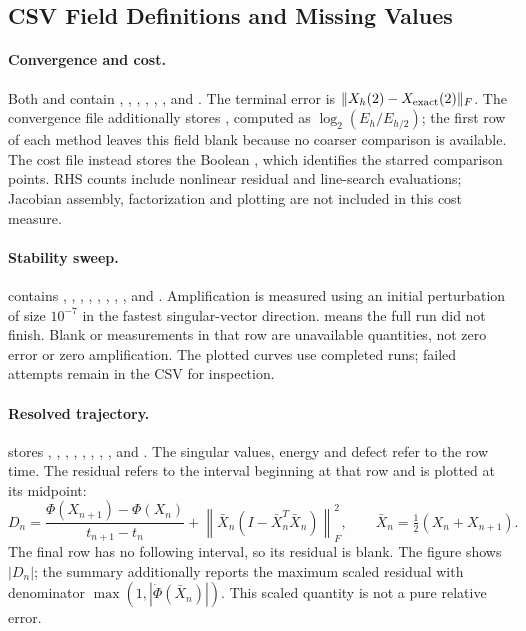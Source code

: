\subsection{CSV Field Definitions and Missing Values}
\begingroup\raggedright
\paragraph{Convergence and cost.}
Both  and  contain
, , ,
, ,
, and .
The terminal error is $\|X_h(2)-X_{\rm exact}(2)\|_F$.
The convergence file additionally stores ,
computed as $\log_2(E_h/E_{h/2})$; the first row of each method leaves
this field blank because no coarser comparison is available.
The cost file instead stores the Boolean ,
which identifies the starred comparison points. RHS counts include
nonlinear residual and line-search evaluations; Jacobian assembly,
factorization and plotting are not included in this cost measure.

\paragraph{Stability sweep.}
 contains , ,
, ,
, ,
, , and
. Amplification is measured using an initial perturbation
of size $10^{-7}$ in the fastest singular-vector direction.
 means the full run did not finish.
Blank or  measurements in that row are unavailable quantities,
not zero error or zero amplification. The plotted curves use completed
runs; failed attempts remain in the CSV for inspection.

\paragraph{Resolved trajectory.}
 stores , , , ,
, , ,
, and
.
The singular values, energy and defect refer to the row time.
The residual refers to the interval beginning at that row and is
plotted at its midpoint:
\[
D_n=\frac{\Phi(X_{n+1})-\Phi(X_n)}{t_{n+1}-t_n}
      +\left\|\bar X_n(I-\bar X_n^T\bar X_n)\right\|_F^2,
\qquad \bar X_n=\tfrac12(X_n+X_{n+1}).
\]
The final row has no following interval, so its residual is blank.
The figure shows $|D_n|$; the summary additionally reports the maximum
scaled residual with denominator $\max(1,|\dot\Phi(\bar X_n)|)$.
This scaled quantity is not a pure relative error.

